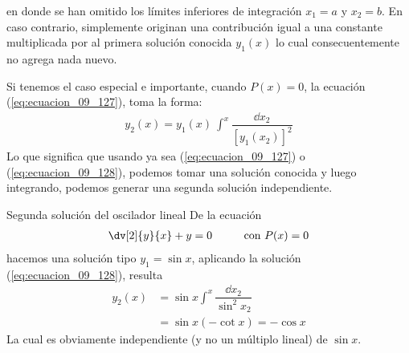 en donde se han omitido los límites inferiores de integración $x_{1} = a$ y $x_{2}=b$. En caso contrario, simplemente originan una contribución igual a una constante multiplicada por al primera solución conocida $y_{1}(x)$ lo cual consecuentemente no agrega nada nuevo.
\par
Si tenemos el caso especial e importante, cuando $P(x) = 0$, la ecuación (\ref{eq:ecuacion_09_127}), toma la forma:
\begin{align}
y_{2}(x) =  y_{1}(x) \: \int^{x} \dfrac{\dd{x_{2}}}{[y_{1}(x_{2})]^{2}}
\label{eq:ecuacion_09_128}
\end{align}
Lo que significa que usando ya sea (\ref{eq:ecuacion_09_127}) o (\ref{eq:ecuacion_09_128}), podemos tomar una solución conocida y luego integrando, podemos generar una segunda solución independiente.
\par
\begin{ejemplo}{Segunda solución del oscilador lineal}
De la ecuación
\begin{align*}
\dv[2]{y}{x} + y = 0 \hspace{1cm} \mbox{con } P(x) = 0
\end{align*}
hacemos una solución tipo $y_{1} = \sin x$, aplicando la solución (\ref{eq:ecuacion_09_128}), resulta
\begin{align*}
y_{2}(x) &= \sin x \int^{x} \dfrac{\dd{x_{2}}}{\sin^{2} x_{2}} \\
&= \sin x (-\cot x) = - \cos x
\end{align*}
La cual es obviamente independiente (y no un múltiplo lineal) de $\sin x$.
\end{ejemplo}
